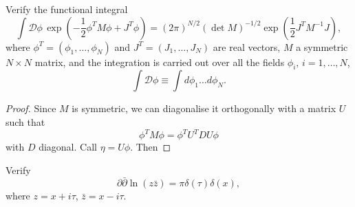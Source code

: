 	\begin{Problem}
	Verify the functional integral
	\[
	\int \mathcal{D}\phi \, \exp\left( -\frac{1}{2} \phi^T M \phi + J^T \phi \right) = (2\pi)^{N/2} (\det M)^{-1/2} \exp\left( \frac{1}{2} J^T M^{-1} J \right),
	\]
	where $\phi^T = (\phi_1, \ldots, \phi_N)$ and $J^T = (J_1, \ldots, J_N)$ are real vectors, $M$ a symmetric $N \times N$ matrix, and the integration is carried out over all the fields $\phi_i,\, i = 1, \ldots, N$,
	\[
	\int \mathcal{D} \phi \equiv \int d\phi_1 \ldots d\phi_N.
	\]
\end{Problem}
	\begin{proof}
		Since $M$ is symmetric, we can diagonalise it orthogonally with a matrix $U$ such that
		\[\phi^T M \phi = \phi^T U^T D U \phi\]
		with $D$ diagonal. Call $\eta = U\phi$. Then 
	\end{proof}
	\begin{Problem}
	Verify
	\[
	\partial \bar{\partial} \ln(z \bar{z}) = \pi \delta(\tau)\delta(x),
	\]
	where $z = x + i \tau$, $\bar{z} = x - i \tau$.
\end{Problem}
	
